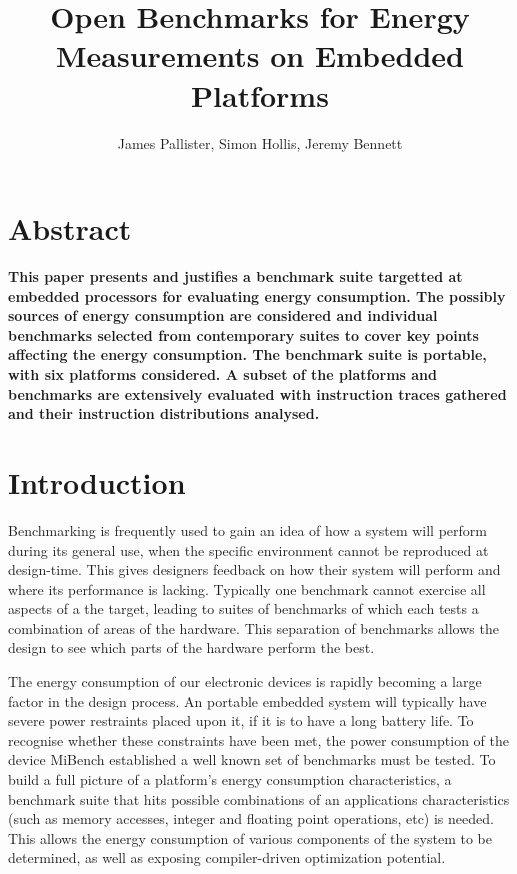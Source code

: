 \documentclass[twocolumn]{article}
\title{\bfseries\fontsize{22}{1}\selectfont Open Benchmarks for Energy Measurements on Embedded Platforms}
\author{James Pallister, Simon Hollis, Jeremy Bennett}
\newcommand{\nsection}[1]{\section{\bfseries #1}}
\begin{document}
\maketitle
\nsection{Abstract}

\textbf{This paper presents and justifies a benchmark suite targetted at embedded processors for evaluating energy consumption. The possibly sources of energy consumption are considered and individual benchmarks selected from contemporary suites to cover key points affecting the energy consumption. The benchmark suite is portable, with six platforms considered. A subset of the platforms and benchmarks are extensively evaluated with instruction traces gathered and their instruction distributions analysed.}

\nsection{Introduction}

Benchmarking is frequently used to gain an idea of how a system will perform during its general use, when the specific environment cannot be reproduced at design-time. This gives designers feedback on how their system will perform and where its performance is lacking. Typically one benchmark cannot exercise all aspects of a the target, leading to suites of benchmarks of which each tests a combination of areas of the hardware. This separation of benchmarks allows the design to see which parts of the hardware perform the best.

The energy consumption of our electronic devices is rapidly becoming a large factor in the design process. An portable embedded system will typically have severe power restraints placed upon it, if it is to have a long battery life. To recognise whether these constraints have been met, the power consumption of the device MiBench established a well known set of benchmarks must be tested. To build a full picture of a platform’s energy consumption characteristics, a benchmark suite that hits possible combinations of an applications characteristics (such as memory accesses, integer and floating point operations, etc) is needed. This allows the energy consumption of various components of the system to be determined, as well as exposing compiler-driven optimization potential.
\end{document}
